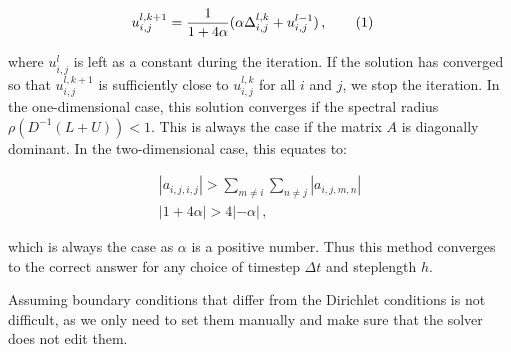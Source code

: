 \documentclass[reprint,english,notitlepage]{revtex4-1}  %
\newcommand\numberthis{\addtocounter{equation}{1}\tag{\theequation}}
\begin{document}
\begin{align*}
u_{i,j}^{l,k+1} &= \frac{1}{1 + 4\alpha} (\alpha \Delta_{i,j}^{l,k} + u_{i,j}^{l-1}) \, , \numberthis \label{eq:2D_diff_eq_jacobi_iter}
\end{align*}

where $u_{i,j}^l$ is left as a constant during the iteration. If the solution has converged so that $u_{i,j}^{l,k+1}$ is sufficiently close to $u_{i,j}^{l,k}$ for all $i$ and $j$, we stop the iteration. In the one-dimensional case, this solution converges if the spectral radius $\rho(D^{-1}(L+U)) < 1$. This is always the case if the matrix $A$ is diagonally dominant. In the two-dimensional case, this equates to:

\begin{align*}
|a_{i,j,i,j}| > \sum\limits_{m\neq i} \sum\limits_{n\neq j} |a_{i,j,m,n}| \\
|1 + 4 \alpha| > 4|-\alpha| \, ,
\end{align*}

which is always the case as $\alpha$ is a positive number. Thus this method converges to the correct answer for any choice of timestep $\Delta t$ and steplength $h$.

Assuming boundary conditions that differ from the Dirichlet conditions is not difficult, as we only need to set them manually and make sure that the solver does not edit them. 





\end{document}
